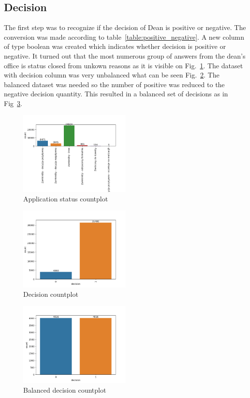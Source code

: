 \subsection{Decision}
The first step was to recognize if the decision of Dean is positive or negative.
The conversion was made according to table~\ref{table:positive_negative}.
A new column of type boolean was created which indicates whether decision is positive or negative.
It turned out that the most numerous group of answers from the dean's office is status closed from unkown reasons as it is visible on Fig.~\ref{fig:application_status_countplot}. The dataset with decision column was very unbalanced what can be seen Fig.~\ref{fig:decision_countplot}. The balanced dataset was needed so the number of positive was reduced to the negative decision quantity. This resulted in a balanced set of decisions as in Fig~\ref{fig:balanced_decision_countplot}.

\begin{figure}
    \includegraphics[width=0.5\textwidth]{img/application_status_countplot.png}
    \caption{Application status countplot}
    \label{fig:application_status_countplot}
\end{figure}

\begin{figure}
    \includegraphics[width=0.5\textwidth]{img/decision_countplot.png}
    \caption{Decision countplot}
    \label{fig:decision_countplot}
\end{figure}

\begin{figure}
    \includegraphics[width=0.5\textwidth]{img/balanced_decision_countplot.png}
    \caption{Balanced decision countplot}
    \label{fig:balanced_decision_countplot}
\end{figure}

